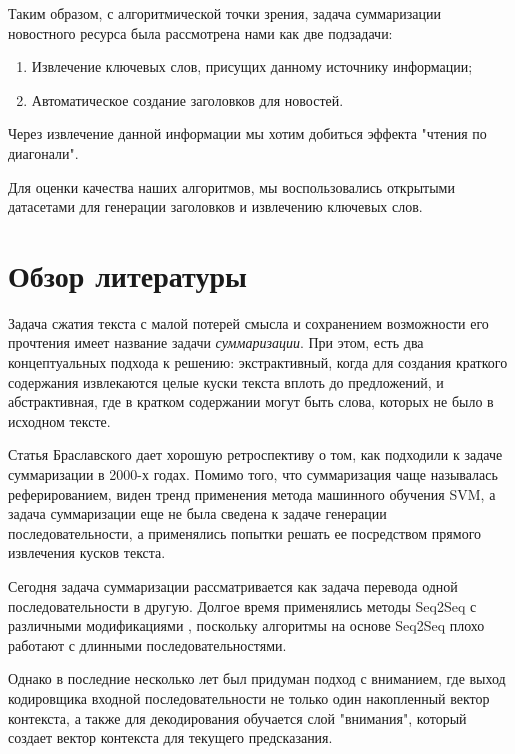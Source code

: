 \documentclass[14pt]{matmex-diploma-custom}
\begin{document}
Таким образом, с алгоритмической точки зрения, задача суммаризации новостного ресурса была рассмотрена нами как две подзадачи:
\begin{enumerate}
  \item Извлечение ключевых слов, присущих данному источнику информации;
  \item Автоматическое создание заголовков для новостей.
\end{enumerate}

Через извлечение данной информации мы хотим добиться эффекта "чтения по диагонали".

Для оценки качества наших алгоритмов, мы воспользовались открытыми датасетами для генерации заголовков и извлечению ключевых слов.

\section{Обзор литературы}
Задача сжатия текста с малой потерей смысла и сохранением возможности его прочтения
имеет название задачи \textit{суммаризации}. При этом, есть два концептуальных подхода к решению:
экстрактивный, когда для создания краткого содержания извлекаются целые куски текста вплоть до предложений,
и абстрактивная, где в кратком содержании могут быть слова, которых не было в исходном тексте.

Статья Браславского \cite{braslavski_gustelev} дает хорошую ретроспективу о том, как подходили к задаче суммаризации в 2000-х годах. Помимо того, что суммаризация чаще называлась реферированием, виден тренд применения метода машинного обучения SVM, а задача суммаризации еще не была сведена к задаче генерации последовательности, а применялись попытки решать ее посредством прямого извлечения кусков текста. 

Сегодня задача суммаризации рассматривается как задача перевода одной последовательности в другую. Долгое время применялись методы Seq2Seq с различными модификациями \cite{Putra2018IncorporatingTS}, поскольку алгоритмы на основе Seq2Seq плохо работают с длинными последовательностями.

Однако в последние несколько лет был придуман подход с вниманием, где выход кодировщика входной последовательности не только один накопленный вектор контекста, а также для декодирования обучается слой "внимания", который создает вектор контекста для текущего предсказания.
\end{document}
